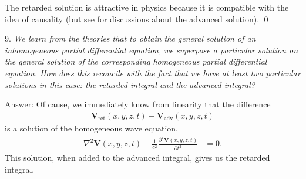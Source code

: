 \documentclass[11pt]{article}              %
\begin{document}
The retarded solution is attractive in physics because it is compatible with the idea of causality (but see \cite{wheeler1945interaction} for discussions about the advanced solution).
\qed

9. {\it We learn from the theories that to obtain the general solution of an inhomogeneous partial differential equation, we superpose a particular solution on the general solution of the corresponding homogeneous partial differential equation. How does this reconcile with the fact that we have at least two particular solutions in this case: the retarded integral and the advanced integral?} 


Answer: Of cause, we immediately know from linearity \cite{podolsky1969fundamentals} that the difference
\begin{align}
{\mathbf V}_{\mbox{ret}}(x,y,z,t)-{\mathbf V}_{\mbox{adv}}(x,y,z,t) \label{eqn:homosolution}
\end{align}
is a solution of the homogeneous wave equation,
\begin{align}
	\nabla^2 {\mathbf V}(x,y,z,t) -\frac{1}{c^2}\frac{\partial^2 {\mathbf V}(x,y,z,t)}{\partial t^2}&=0.\label{eqn:homo}
\end{align}
This solution, when added to the advanced integral, gives us the retarded integral.
\end{document}
